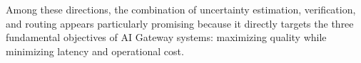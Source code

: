 \documentclass[11pt,a4paper]{article}
\begin{document}
Among these directions, the combination of uncertainty estimation, verification, and routing appears particularly promising because it directly targets the three fundamental objectives of AI Gateway systems: maximizing quality while minimizing latency and operational cost.



\end{document}
